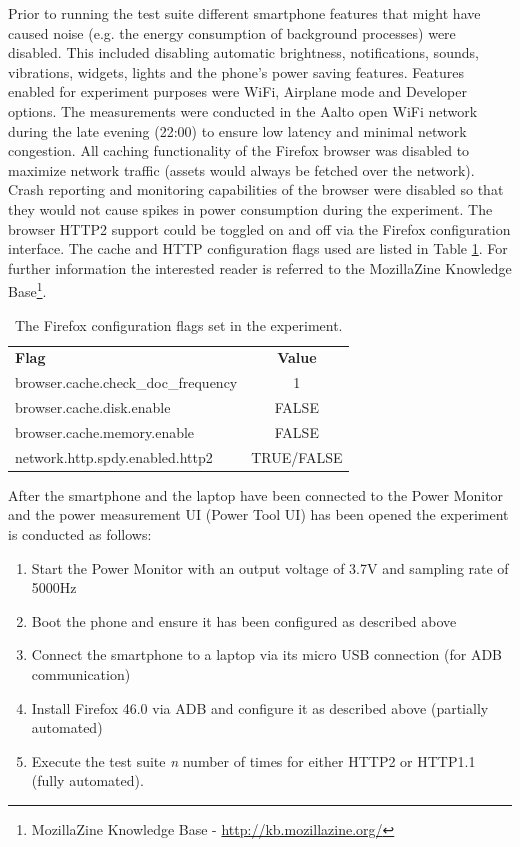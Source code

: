 \documentclass{article}
\begin{document}
Prior to running the test suite different smartphone features that might have caused noise (e.g. the energy consumption of background processes) were disabled. This included disabling automatic brightness, notifications, sounds, vibrations, widgets, lights and the phone's power saving features. Features enabled for experiment purposes were WiFi, Airplane mode and Developer options. The measurements were conducted in the Aalto open WiFi network during the late evening (22:00) to ensure low latency and minimal network congestion. All caching functionality of the Firefox browser was disabled to maximize network traffic (assets would always be fetched over the network). Crash reporting and monitoring capabilities of the browser were disabled so that they would not cause spikes in power consumption during the experiment. The browser HTTP2 support could be toggled on and off via the Firefox configuration interface. The cache and HTTP configuration flags used are listed in Table \ref{table:firefox_flags}. For further information the interested reader is referred to the MozillaZine Knowledge Base\footnote{MozillaZine Knowledge Base - \url{http://kb.mozillazine.org/}}.

\clearpage

\begin{table}[]
    \centering
    \begin{tabular}{l|c|}
        \textbf{Flag} & \textbf{Value} \\
        browser.cache.check\_doc\_frequency & 1 \\
        browser.cache.disk.enable           & FALSE \\
        browser.cache.memory.enable         & FALSE \\
        network.http.spdy.enabled.http2     & TRUE/FALSE
    \end{tabular}
    \caption{The Firefox configuration flags set in the experiment.}
    \label{table:firefox_flags}
\end{table}

After the smartphone and the laptop have been connected to the Power Monitor and the power measurement UI (Power Tool UI) has been opened the experiment is conducted as follows:

\begin{enumerate}
    \item Start the Power Monitor with an output voltage of 3.7V and sampling rate of 5000Hz
    \item Boot the phone and ensure it has been configured as described above
    \item Connect the smartphone to a laptop via its micro USB connection (for ADB communication)
    \item Install Firefox 46.0 via ADB and configure it as described above (partially automated)
    \item Execute the test suite \emph{n} number of times for either HTTP2 or HTTP1.1 (fully automated).
\end{enumerate}
\end{document}
